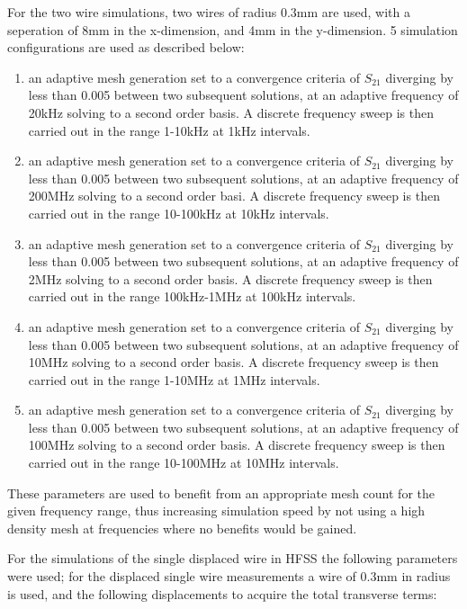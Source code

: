 For the two wire simulations, two wires of radius 0.3mm are used, with a seperation of 8mm in the x-dimension, and 4mm in the y-dimension. 5 simulation configurations are used as described below:

\begin{enumerate}
\item{an adaptive mesh generation set to a convergence criteria of $S_{21}$ diverging by less than 0.005 between two subsequent solutions, at an adaptive frequency of 20kHz solving to a second order basis. A discrete frequency sweep is then carried out in the range 1-10kHz at 1kHz intervals.}
\item{an adaptive mesh generation set to a convergence criteria of $S_{21}$ diverging by less than 0.005 between two subsequent solutions, at an adaptive frequency of 200MHz solving to a second order basi. A discrete frequency sweep is then carried out in the range 10-100kHz at 10kHz intervals.}
\item{an adaptive mesh generation set to a convergence criteria of $S_{21}$ diverging by less than 0.005 between two subsequent solutions, at an adaptive frequency of 2MHz solving to a second order basis. A discrete frequency sweep is then carried out in the range 100kHz-1MHz at 100kHz intervals.}
\item{an adaptive mesh generation set to a convergence criteria of $S_{21}$ diverging by less than 0.005 between two subsequent solutions, at an adaptive frequency of 10MHz solving to a second order basis. A discrete frequency sweep is then carried out in the range 1-10MHz at 1MHz intervals.}
\item{an adaptive mesh generation set to a convergence criteria of $S_{21}$ diverging by less than 0.005 between two subsequent solutions, at an adaptive frequency of 100MHz solving to a second order basis. A discrete frequency sweep is then carried out in the range 10-100MHz at 10MHz intervals.}
\end{enumerate}

These parameters are used to benefit from an appropriate mesh count for the given frequency range, thus increasing simulation speed by not using a high density mesh at frequencies where no benefits would be gained.

For the simulations of the single displaced wire in HFSS the following parameters were used; for the displaced single wire measurements a wire of 0.3mm in radius is used, and the following displacements to acquire the total transverse terms:

